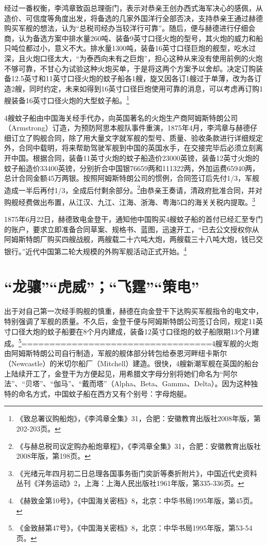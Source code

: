 \documentclass[12pt,UTF8]{ctexbook}
\begin{document}
经过一番权衡，李鸿章致函总理衙门，表示对恭亲王创办西式海军决心的感佩，从造价、可信度等角度出发，将备选的几家外国洋行全部否决，支持恭亲王通过赫德购买军舰的想法，认为“总税司经办当较洋行可靠”。随后，便与赫德进行仔细会商，认为备选方案中排水量260吨、装备9英寸口径火炮的型号，其火炮的威力和船只吨位都过小，意义不大。排水量1300吨，装备16英寸口径巨炮的舰型，吃水过深，且火炮口径太大，“为泰西向未有之巨炮”，担心这种从来没有使用前例的火炮不够可靠，不甘心为试验这种火炮买单，于是将这两个方案予以舍却。决定订购装备12.5英寸和11英寸口径火炮的蚊子船各1艘，旋又因各订1艘过于单薄，改为各订造2艘，同时约定，未来如得到16英寸口径巨炮使用可靠的消息，可以考虑再订购1艘装备16英寸口径火炮的大型蚊子船。\footnote{《致总署议购船炮》，《李鸿章全集》31，合肥：安徽教育出版社2008年版，第202-203页。}

4艘蚊子船由中国海关经手代办，向英国著名的火炮生产商阿姆斯特朗公司（Armstrong）订造，为预防阿思本舰队事件重演，1875年4月，李鸿章与赫德仔细订立了购舰合同，除了用大量文字就军舰的型号、质量、验收条款进行详细规定外，合同中载明，将来帮助驾驶军舰到中国的英国水手，在交接完毕后必须立刻离开中国。根据合同，装备11英寸火炮的蚊子船造价23000英镑，装备12英寸火炮的蚊子船造价33400英镑，分别折合中国银76659两和111322两，外加运费65940两，总计合同金额45万两银。按照阿姆斯特朗公司的惯例，合同签订后先付1/3，军舰造成一半后再付1/3，全成后付剩余部分。\footnote{《与赫总税司议定购办船炮章程》，《李鸿章全集》31，合肥：安徽教育出版社2008年版，第198页。}由恭亲王奏请，清政府批准合同，并对购舰经费做出布置，从江汉、九江、江海、浙海、粤海5口的海关关税内提取。\footnote{《光绪元年四月初二日总理各国事务衙门奕訢等奏折附片》，中国近代史资料丛刊《洋务运动》2，上海：上海人民出版社1961年版，第335-336页。}

1875年6月22日，赫德致电金登干，通知他中国购买4艘蚊子船的首付已经汇至专门的账户，要求立即准备合同草案、规格书、蓝图，迅速开工，“已去公文授权你从阿姆斯特朗厂购买四艘战舰，两艘载二十六吨大炮，两艘载三十八吨大炮，钱已交银行。”近代中国第二轮大规模的外购军舰活动正式开始。\footnote{《赫致金第10号》，《中国海关密档》8，北京：中华书局1995年版，第45页。}

\section{“龙骧”“虎威”；“飞霆”“策电”}

出于对自己第一次经手购舰的慎重，赫德在向金登干下达购买军舰指令的电文中，特别强调了军舰的质量。不久后，金登干便与阿姆斯特朗公司签订合同，规定11英寸口径大炮的蚊子船要在8个月内建成，装备12英寸口径炮的蚊子船限期13个月建成。\footnote{《金致赫第47号》，《中国海关密档》8，北京：中华书局1995年版，第53-54页。}==================================4艘军舰的火炮由阿姆斯特朗公司自行制造，军舰的舰体部分转包给泰恩河畔纽卡斯尔（Newcastle）的米切尔船厂（Mitchell）建造。很快，4艘新潮军舰在英国的船台上陆续开工了，金登干为方便起见，用希腊文字母分别将她们命名为“阿尔法”、“贝塔”、“伽马”、“戴而塔”（Alpha、Beta、Gamma、Delta）。因为这种独特的命名方式，中国蚊子船在西方又有个别号：字母炮艇。
\end{document}

